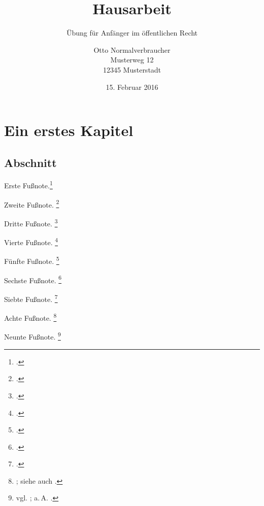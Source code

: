 \documentclass{hausarbeit-jura}
\begin{document}

\title{Hausarbeit}
\subtitle{Übung für Anfänger im öffentlichen Recht}
\author{Otto Normalverbraucher\\Musterweg 12\\12345 Musterstadt}
\date{15. Februar 2016}
\maketitle

\tableofcontents %



\chapter{Ein erstes Kapitel}\label{chap:ErstesKapitel}

\section{Abschnitt}
\blindtext[4]


Erste Fußnote.\footcite[33]{larenz:methoden}

Zweite Fußnote. \footcite[§~7 Rn.~7]{maurer:allgverwr}

Dritte Fußnote. \footcite[Rn.~204]{medicus:br}

Vierte Fußnote. \footcite{stamm:verzinsung}

Fünfte Fußnote. \footcite[3]{stamm:zweiter}

Sechste Fußnote. \footcite[vgl.][517]{gehrlein:vollstreckung}

Siebte Fußnote. \footcite[(Ellenberger)§~119 Rn.~4]{palandt}

Achte Fußnote. \footnote{\cite[(Flechtner)§~2059 BGB Rn.~1]{erbr}; siehe auch \cite[(Kindler)Vorbem. §§~1--7 (Kaufmannsbegriff) Rn.~3]{ebjs1}.}

Neunte Fußnote. \footnote{vgl. \cite[Schmidt-Aßmann][Art.~19 Abs.~4 Rn.~36]{maunzduerig}; a.\,A. \cite[Diemer][§~151 Rn.~2]{kkstpo}.}
\end{document}
